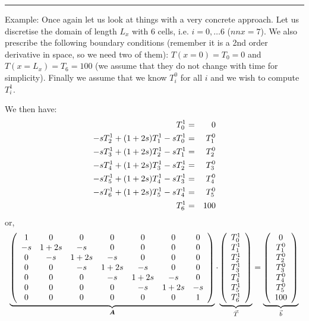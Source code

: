 \begin{center}
\begin{minipage}[t]{0.77\textwidth}
\par\noindent\rule{\textwidth}{0.4pt}
{\color{blue} Example}: 
Once again let us look at things with a very concrete approach. Let us discretise the 
domain of length $L_x$ with 6 cells, i.e. $i=0,\dots 6$ ($nnx=7$).
We also prescribe the following boundary conditions (remember it is a 2nd order derivative in space, 
so we need two of them): $T(x=0)=T_0=0$ and $T(x=L_x)=T_6=100$ (we assume that they 
do not change with time for simplicity). Finally we assume that we 
know $T_i^0$ for all $i$ and we wish to compute $T_i^1$.

We then have:
\begin{eqnarray}
T_0^1 &=& 0 \nonumber\\
-s T_{2}^{1} + (1+2s) T_{1}^{1} - s T_{0}^{1} &=& T_1^{0} \nonumber\\
-s T_{3}^{1} + (1+2s) T_{2}^{1} - s T_{1}^{1} &=& T_2^{0} \nonumber\\
-s T_{4}^{1} + (1+2s) T_{3}^{1} - s T_{2}^{1} &=& T_3^{0} \nonumber\\
-s T_{5}^{1} + (1+2s) T_{4}^{1} - s T_{3}^{1} &=& T_4^{0} \nonumber\\
-s T_{6}^{1} + (1+2s) T_{5}^{1} - s T_{4}^{1} &=& T_5^{0} \nonumber\\
T_6^1 &=& 100
\end{eqnarray}
or, 
\begin{equation}
\underbrace{
\left(
\begin{array}{ccccccc}
1 & 0 & 0 & 0 & 0 & 0 & 0  \\
-s & 1+2s & -s & 0 & 0 & 0 & 0 \\
0 & -s & 1+2s & -s & 0 & 0 & 0 \\
0 & 0 & -s & 1+2s & -s & 0 & 0 \\
0 & 0 & 0 & -s & 1+2s & -s & 0 \\
0 & 0 & 0 & 0 & -s & 1+2s & -s \\
0 & 0 & 0 & 0 & 0 & 0 & 1
\end{array}
\right)
}_{\bm A}
\cdot
\underbrace{
\left(
\begin{array}{ccccccc}
T_0^1 \\ T_1^1 \\ T_2^1 \\ T_3^1 \\ T_4^1 \\ T_5^1 \\ T_6^1  
\end{array}
\right)
}_{\vec{T}}
=
\underbrace{
\left(
\begin{array}{ccccccc}
0 \\ T_1^0\\ T_2^0\\ T_3^0\\ T_4^0\\ T_5^0 \\ 100
\end{array}
\right)
}_{\vec{b}} \nonumber
\end{equation}


\end{minipage}
\end{center}
